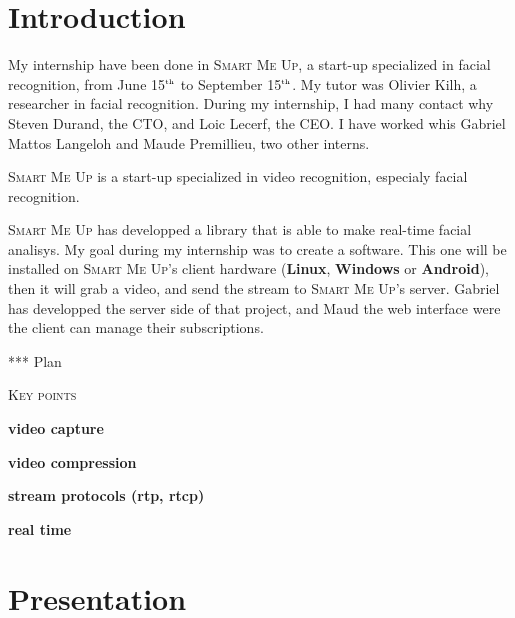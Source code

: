 \documentclass[a4paper,11pt]{custom}
\newcommand{\smu}{\textsc{Smart Me Up}}
\newcommand{\linux}{\textbf{Linux}}
\newcommand{\win}{\textbf{Windows}}
\newcommand{\android}{\textbf{Android}}
\newcommand{\nth}[1]{#1$^{\text{\tiny th}}$}
\begin{document}

\chapter{Introduction}

My internship have been done in \smu, a start-up specialized in facial
recognition, from June \nth{15} to September \nth{15}. My tutor was Olivier
Kilh, a researcher in facial recognition. During my internship, I had many
contact why Steven Durand, the CTO, and Loic Lecerf, the CEO. I have worked whis
Gabriel Mattos Langeloh and Maude Premillieu, two other interns.

\smu{} is a start-up specialized in video recognition, especialy facial
recognition.

\smu{} has developped a library that is able to make real-time facial analisys.
My goal during my internship was to create a software. This one will be
installed on \smu's client hardware (\linux, \win{} or \android), then it will
grab a video, and send the stream to \smu's server. Gabriel has developped the
server side of that project, and Maud the web interface were the client can
manage their subscriptions.

*** Plan

\vspace{\fill}

\begin{center}
\textsc{\textsc{Key points}}
\end{center}

\begin{itemize}
\begin{multicols}{2}
\item \textbf{video capture}
\item \textbf{video compression}
\item \textbf{stream protocols (rtp, rtcp)}
\item \textbf{real time}
\end{multicols}
\end{itemize}

\chapter{Presentation}
\end{document}
